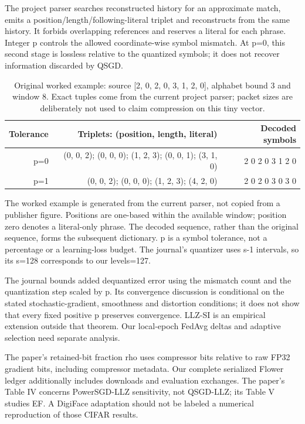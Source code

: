 \documentclass[11pt,a4paper]{article}
\begin{document}
The project parser searches reconstructed history for an approximate match, emits a position/length/following-literal triplet and reconstructs from the same history. It forbids overlapping references and reserves a literal for each phrase. Integer p controls the allowed coordinate-wise symbol mismatch. At p=0, this second stage is lossless relative to the quantized symbols; it does not recover information discarded by QSGD.

\begin{table}[htbp]
\centering
\small
\begin{tabularx}{\textwidth}{R{0.42000}R{1.68000}R{0.90000}}
\toprule
\textbf{Tolerance} & \textbf{Triplets: (position, length, literal)} & \textbf{Decoded symbols} \\\midrule
p=0 & (0, 0, 2); (0, 0, 0); (1, 2, 3); (0, 0, 1); (3, 1, 0) & 2 0 2 0 3 1 2 0 \\
p=1 & (0, 0, 2); (0, 0, 0); (1, 2, 3); (4, 2, 0) & 2 0 2 0 3 0 3 0 \\
\bottomrule
\end{tabularx}
\caption{Original worked example: source [2, 0, 2, 0, 3, 1, 2, 0], alphabet bound 3 and window 8. Exact tuples come from the current project parser; packet sizes are deliberately not used to claim compression on this tiny vector.}
\label{tab:llz-example}
\end{table}

The worked example is generated from the current parser, not copied from a publisher figure. Positions are one-based within the available window; position zero denotes a literal-only phrase. The decoded sequence, rather than the original sequence, forms the subsequent dictionary. p is a symbol tolerance, not a percentage or a learning-loss budget. The journal's quantizer uses s-1 intervals, so its s=128 corresponds to our levels=127.

The journal bounds added dequantized error using the mismatch count and the quantization step scaled by p. Its convergence discussion is conditional on the stated stochastic-gradient, smoothness and distortion conditions; it does not show that every fixed positive p preserves convergence. LLZ-SI is an empirical extension outside that theorem. Our local-epoch FedAvg deltas and adaptive selection need separate analysis. \parencite{cao2026llz}

The paper's retained-bit fraction rho uses compressor bits relative to raw FP32 gradient bits, including compressor metadata. Our complete serialized Flower ledger additionally includes downloads and evaluation exchanges. The paper's Table IV concerns PowerSGD-LLZ sensitivity, not QSGD-LLZ; its Table V studies EF. A DigiFace adaptation should not be labeled a numerical reproduction of those CIFAR results.
\end{document}
